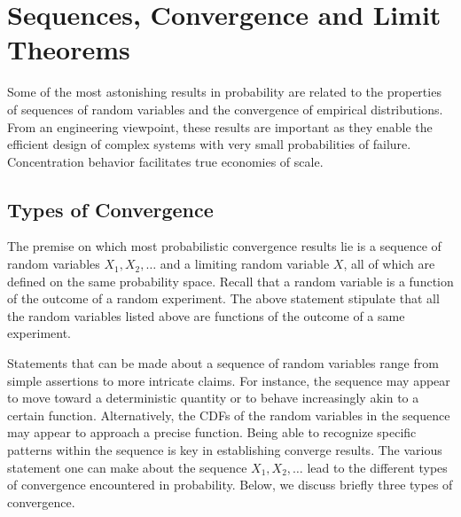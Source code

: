 \chapter[Limit Theorems]{Sequences, Convergence and Limit Theorems}

Some of the most astonishing results in probability are related to the properties of sequences of random variables and the convergence of empirical distributions.
From an engineering viewpoint, these results are important as they enable the efficient design of complex systems with very small probabilities of failure.
Concentration behavior facilitates true economies of scale. 


\section{Types of Convergence}

The premise on which most probabilistic convergence results lie is a sequence of random variables $X_1, X_2, \ldots$ and a limiting random variable $X$, all of which are defined on the same probability space.
Recall that a random variable is a function of the outcome of a random experiment.
The above statement stipulate that all the random variables listed above are functions of the outcome of a same experiment.

Statements that can be made about a sequence of random variables range from simple assertions to more intricate claims.
For instance, the sequence may appear to move toward a deterministic quantity or to behave increasingly akin to a certain function.
Alternatively, the CDFs of the random variables in the sequence may appear to approach a precise function.
Being able to recognize specific patterns within the sequence is key in establishing converge results.
The various statement one can make about the sequence $X_1, X_2, \ldots$ lead to the different types of convergence encountered in probability.
Below, we discuss briefly three types of convergence.

